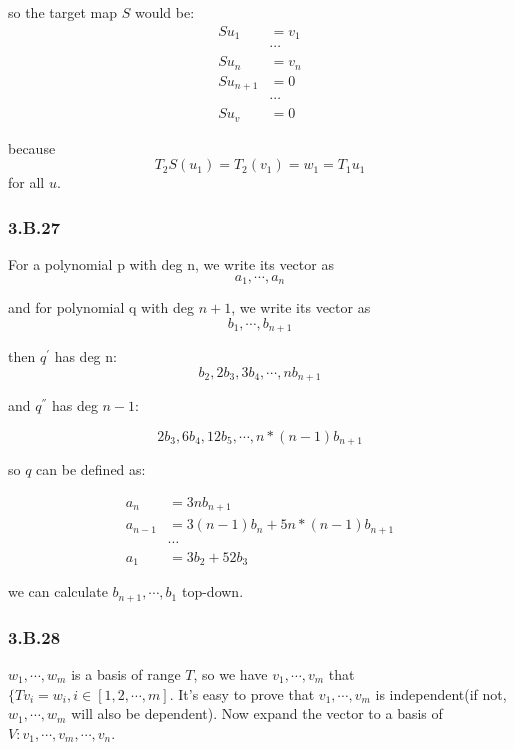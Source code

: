 so the target map $S$ would be:
\begin{equation*}
    \begin{split}
Su_{1} &= v_{1} \\
&\cdots \\
Su_{n} &= v_{n} \\
Su_{n+1} &= 0 \\
&\cdots \\
Su_{v} &= 0 
\end{split}
\end{equation*}

because 
\[T_{2}S(u_{1}) = T_{2}(v_{1}) = w_{1} = T_{1}u_{1} \] for all $u$.

\subsubsection*{3.B.27}

For a polynomial p with deg n, we write its vector as 
\[a_{1}, \cdots, a_{n}\]

and for polynomial q with deg $n+1$, we write its vector as
\[b_{1}, \cdots, b_{n+1} \]

then $q^{'}$ has deg n:
\[b_{2}, 2b_{3}, 3b_{4},\cdots, nb_{n+1}\]

and $q^{''}$ has deg $n-1$:

\[2b_{3}, 6b_{4}, 12b_{5},\cdots, n*(n-1)b_{n+1}\]

so $q$ can be defined as:

\begin{equation*}
    \begin{split}
    a_{n} &= 3nb_{n+1} \\
    a_{n-1} &= 3(n-1)b_{n} + 5n*(n-1)b_{n+1} \\
    &\cdots \\
    a_{1} & = 3b_{2} + 52b_{3}
\end{split}
\end{equation*}

we can calculate $b_{n+1},\cdots, b_{1}$ top-down.

\subsubsection*{3.B.28}

$w_{1}, \cdots, w_{m}$ is a basis of range $T$, so we have $v_{1},\cdots, v_{m}$ that $\{Tv_{i} = w_{i}, i\in [1, 2,\cdots, m]$. 
It's easy to prove that $v_{1}, \cdots, v_{m}$ is independent(if not, $w_{1}, \cdots, w_{m}$ will also be dependent). Now expand the vector to a basis of $V: v_{1},\cdots, v_{m},\cdots, v_{n}$.

